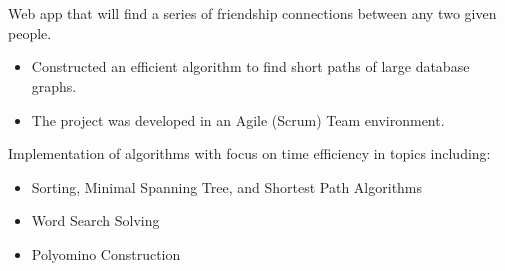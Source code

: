 \begin{resume}

\begin{formatb}
  \\
  \body\\
\end{formatb}

\begin{position}
  Web app that will find a series of friendship connections between any two given people. 
\end{position}
\begin{itemize}
\item Constructed an efficient algorithm to find short paths of large database graphs.
\end{itemize}
\begin{itemize}
\item The project was developed in an Agile (Scrum) Team environment.
\end{itemize}

\begin{position}
Implementation of algorithms with focus on time efficiency in topics including:%
\end{position}
\begin{itemize}
\item Sorting, Minimal Spanning Tree, and Shortest Path Algorithms%
\end{itemize}
\begin{itemize}
\item Word Search Solving%
\end{itemize}
\begin{itemize}
\item Polyomino Construction%
\end{itemize}


\end{resume}
